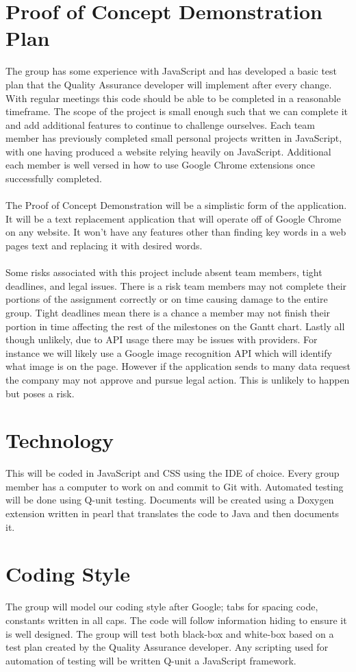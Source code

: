\documentclass{article}
\begin{document}
\section{Proof of Concept Demonstration Plan}
The group has some experience with JavaScript and has developed a basic test plan that the Quality Assurance developer will implement after every change. With regular meetings this code should be able to be completed in a reasonable timeframe. The scope of the project is small enough such that we can complete it and add additional features to continue to challenge ourselves. Each team member has previously completed small personal projects written in JavaScript, with one having produced a website relying heavily on JavaScript. Additional each member is well versed in how to use Google Chrome extensions once successfully completed. \\
\\
The Proof of Concept Demonstration will be a simplistic form of the application. It will be a text replacement application that will operate off of Google Chrome on any website. It won't have any features other than finding key words in a web pages text and replacing it with desired words. \\
\\
Some risks associated with this project include absent team members, tight deadlines, and legal issues. There is a risk team members may not complete their portions of the assignment correctly or on time causing damage to the entire group. Tight deadlines mean there is a chance a member may not finish their portion in time affecting the rest of the milestones on the Gantt chart. Lastly all though unlikely, due to API usage there may be issues with providers. For instance we will likely use a Google image recognition API which will identify what image is on the page. However if the application sends to many data request the company may not approve and pursue legal action. This is unlikely to happen but poses a risk.
\section{Technology}
This will be coded in JavaScript and CSS using the IDE of choice. Every group member has a computer to work on and commit to Git with. Automated testing will be done using Q-unit testing. Documents will be created using a Doxygen extension written in pearl that translates the code to Java and then documents it.
\section{Coding Style}
The group will model our coding style after Google; tabs for spacing code, constants written in all caps. The code will follow information hiding to ensure it is well designed. The group will test both black-box and white-box based on a test plan created by the Quality Assurance developer. Any scripting used for automation of testing will be written Q-unit a JavaScript framework.
\end{document}

